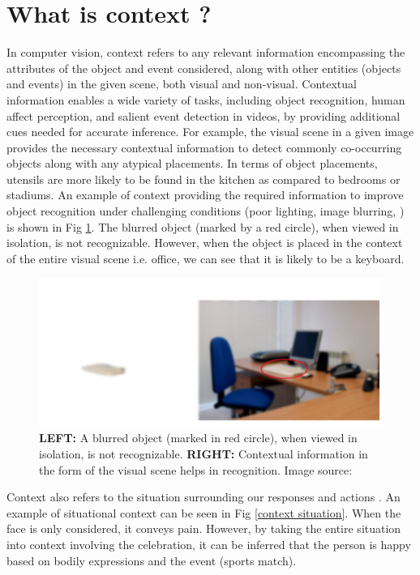 \section{What is context ?}
In computer vision, context \cite{contextvision} refers to any relevant information encompassing the attributes of the object and event considered, along with other entities (objects and events) in the given scene, both visual and non-visual. Contextual information enables a wide variety of tasks, including object recognition, human affect perception, and salient event detection in videos, by providing additional cues needed for accurate inference. For example, the visual scene in a given image provides the necessary contextual information to detect commonly co-occurring objects along with any atypical placements. In terms of object placements, utensils are more likely to be found in the kitchen as compared to bedrooms or stadiums. An example of context providing the required information to improve object recognition under challenging conditions (poor lighting, image blurring, ) is shown in Fig \ref{object recognition}. The blurred object (marked by a red circle), when viewed in isolation, is not recognizable. However, when the object is placed in the context of the entire visual scene i.e. office, we can see that it is likely to be a keyboard.
\begin{figure}[h!]
    \centering 
     \includegraphics[width=0.6\linewidth]{figures/blurred_object.png}
     \caption{ \textbf{LEFT:} A blurred object (marked in red circle), when viewed in isolation, is not recognizable. \textbf{RIGHT:} Contextual information in the form of the visual scene helps in recognition. Image source: \cite{Marques2010ContextMI}}
     \label{object recognition}
\end{figure}

Context also refers to the situation surrounding our responses and actions \cite{baez2018does}. An example of situational context can be seen in Fig \ref{context situation}. When the face is only considered, it conveys pain. However, by taking the entire situation into context involving the celebration, it can be inferred that the person is happy based on bodily expressions and the event (sports match). 

